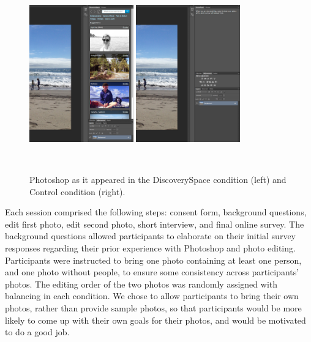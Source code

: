 \begin{figure}[b!]
\centering
  \includegraphics[width=0.4\textwidth]{discoveryspace/figures/experiment-DS.png}
  \includegraphics[width=0.4\textwidth]{discoveryspace/figures/experiment-C.png}
  \caption{Photoshop as it appeared in the DiscoverySpace condition (left) and Control condition (right).}~\label{fig:discoveryspace_exp_interface}
\end{figure}

Each session comprised the following steps: consent form, background questions, edit first photo, edit second photo, short interview, and final online survey. The background questions allowed participants to elaborate on their initial survey responses regarding their prior experience with Photoshop and photo editing. Participants were instructed to bring one photo containing at least one person, and one photo without people, to ensure some consistency across participants' photos. The editing order of the two photos was randomly assigned with balancing in each condition. We chose to allow participants to bring their own photos, rather than provide sample photos, so that participants would be more likely to come up with their own goals for their photos, and would be motivated to do a good job. 

